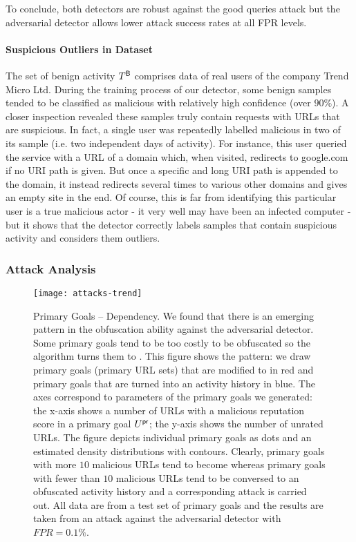 To conclude, both detectors are robust against the good queries attack but the adversarial detector allows lower attack success rates at all FPR levels.


\paragraph{Suspicious Outliers in Dataset}
The set of benign activity $T^{\mathsf{B}}$ comprises data of real users of the company Trend Micro Ltd. During the training process of our detector, some benign samples tended to be classified as malicious with relatively high confidence (over $90\%$). A closer inspection revealed these samples truly contain requests with URLs that are suspicious. In fact, a single user was repeatedly labelled malicious in two of its sample (i.e. two independent days of activity). For instance, this user queried the service with a URL of a domain which, when visited, redirects to google.com if no URI path is given. But once a specific and long URI path is appended to the domain, it instead redirects several times to various other domains and gives an empty site in the end. Of course, this is far from identifying this particular user is a true malicious actor - it very well may have been an infected computer - but it shows that the detector correctly labels samples that contain suspicious activity and considers them outliers.

\subsubsection{Attack Analysis}\label{sec:attack_analysis}

\begin{figure}[p]
    \centering

    \texttt{[image: attacks-trend]}
    \caption{Primary Goals – \NA Dependency. We found that there is an emerging pattern in the obfuscation ability against the adversarial detector. Some primary goals tend to be too costly to be obfuscated so the algorithm turns them to \NA. This figure shows the pattern: we draw primary goals (primary URL sets) that are modified to \NA in red and primary goals that are turned into an activity history in blue. The axes correspond to parameters of the primary goals we generated: the x-axis shows a number of URLs with a malicious reputation score in a primary goal $U^{\mathsf{pr}}$; the y-axis shows the number of unrated URLs. The figure depicts individual primary goals as dots and an estimated density distributions with contours. Clearly, primary goals with more $10$ malicious URLs tend to become \NA whereas primary goals with fewer than $10$ malicious URLs tend to be conversed to an obfuscated activity history and a corresponding attack is carried out. All data are from a test set of primary goals and the results are taken from an attack against the adversarial detector with $FPR = 0.1\%$.}\label{fig:attack-trends}

\end{figure}

